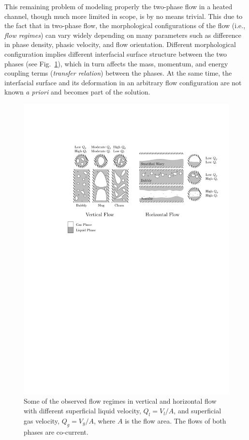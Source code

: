 This remaining problem of modeling properly the two-phase flow in a heated channel, though much more limited in scope, is by no means trivial.
This due to the fact that in two-phase flow, the morphological configurations of the flow (i.e., \emph{flow regimes}) can vary widely depending on many parameters such as difference in phase density, phasic velocity, and flow orientation.
Different morphological configuration implies different interfacial surface structure between the two phases (see Fig.~\ref{fig:flow_regimes}), 
which in turn affects the mass, momentum, and energy coupling terms (\emph{transfer relation}) between the phases.
At the same time, the interfacial surface and its deformation in an arbitrary flow configuration are not known \emph{a priori} and becomes part of the solution.
\begin{figure}[bth!]
	\centering
	\includegraphics[width=\textwidth]{../figures/flowRegimes/flowRegimes.pdf}
	\caption[Some of the observed flow regimes in vertical and horizontal flow]{Some of the observed flow regimes in vertical and horizontal flow with different superficial liquid velocity, $Q_l = V_l / A$, and superficial gas velocity, $Q_g = V_g / A$, where $A$ is the flow area. The flows of both phases are co-current.}
	\label{fig:flow_regimes}
\end{figure}

